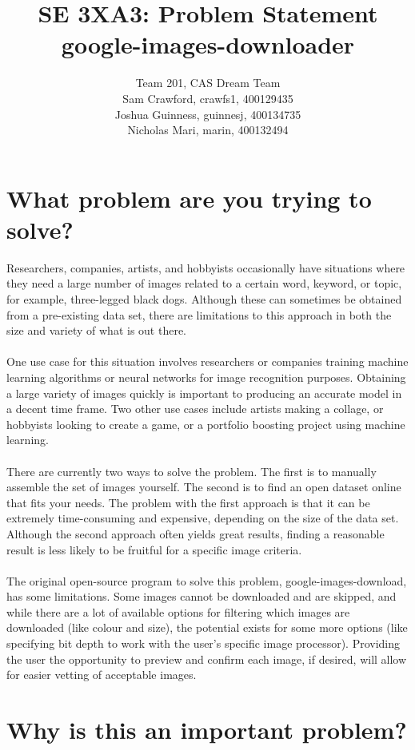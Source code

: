 \documentclass{article}
\title{SE 3XA3: Problem Statement\\google-images-downloader}
\author{Team 201, CAS Dream Team
		\\ Sam Crawford, crawfs1, 400129435
		\\ Joshua Guinness, guinnesj, 400134735
		\\ Nicholas Mari, marin, 400132494
}
\date{}
\begin{document}
\maketitle

\section* {What problem are you trying to solve?}

Researchers, companies, artists, and hobbyists occasionally have situations where they need a large number of images related to a certain word, keyword, or topic, for example, three-legged black dogs. Although these can sometimes be obtained from a pre-existing data set, there are limitations to this approach in both the size and variety of what is out there.
\\\\One use case for this situation involves researchers or companies training machine learning algorithms or neural networks for image recognition purposes. Obtaining a large variety of images quickly is important to producing an accurate model in a decent time frame. Two other use cases include artists making a collage, or hobbyists looking to create a game, or a portfolio boosting project using machine learning.
\\\\There are currently two ways to solve the problem. The first is to manually assemble the set of images yourself. The second is to find an open dataset online that fits your needs. The problem with the first approach is that it can be extremely time-consuming and expensive, depending on the size of the data set. Although the second approach often yields great results, finding a reasonable result is less likely to be fruitful for a specific image criteria.
\\\\The original open-source program to solve this problem, google-images-download, has some limitations. Some images cannot be downloaded and are skipped, and while there are a lot of available options for filtering which images are downloaded (like colour and size), the potential exists for some more options (like specifying bit depth to work with the user’s specific image processor). Providing the user the opportunity to preview and confirm each image, if desired, will allow for easier vetting of acceptable images.


\section* {Why is this an important problem?}
\end{document}
